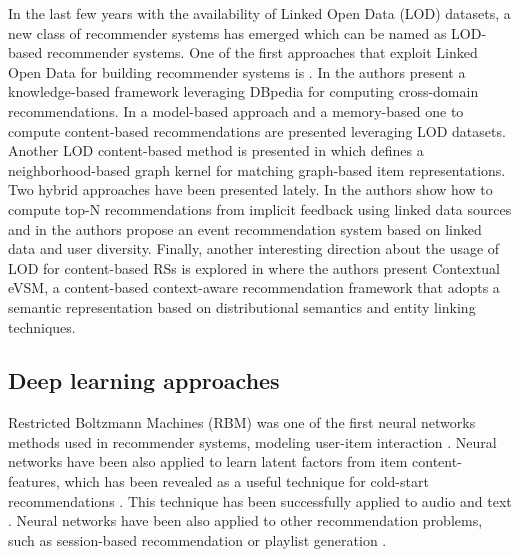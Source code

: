 In the last few years with the availability of Linked Open Data (LOD) datasets, a new class of recommender systems has emerged which can be named as LOD-based recommender systems. 
One of the first approaches that exploit Linked Open Data for building recommender systems is \citep{HeitmannH10}. 
In \citep{Fernandez-Tobias2011} the authors present a knowledge-based framework leveraging DBpedia for computing cross-domain recommendations. 
In \citep{DMOR12,DMORZ12} a model-based approach and a memory-based one to compute content-based recommendations are presented leveraging LOD datasets. Another LOD content-based method is presented in \citep{ODMD14a} which defines a neighborhood-based graph kernel for matching graph-based item representations. 
Two hybrid approaches have been presented lately. In \citep{Ostuni2013} the authors show how to compute top-N recommendations from implicit feedback using linked data sources and in \citep{Khrouf2013} the authors propose an event recommendation system based on linked data and user diversity. 
Finally, another interesting direction about the usage of LOD for content-based RSs is explored in \citep{MustoSLG14} where the authors present Contextual eVSM, a content-based context-aware recommendation framework that adopts a semantic representation based on distributional semantics and entity linking techniques.%

\subsection{Deep learning approaches}

Restricted Boltzmann Machines (RBM) was one of the first neural networks methods used in recommender systems, modeling user-item interaction \citep{salakhutdinov2007restricted}. Neural networks have been also applied to learn latent factors from item content-features, which has been revealed as a useful technique for cold-start recommendations \citep{wang2015collaborative}. This technique has been successfully applied to audio \citep{Oord2013} and text \citep{bansal2016ask}. Neural networks have been also applied to other recommendation problems, such as session-based recommendation \citep{hidasi2015session} or playlist generation \citep{vall2017music}.



